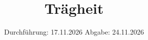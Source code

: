 




\subject{V101}
\title{Trägheit}
\date{%
  Durchführung: 17.11.2026
  \hspace{3em}
  Abgabe: 24.11.2026
}



\maketitle
\thispagestyle{empty}
\tableofcontents
\newpage






\printbibliography{}




